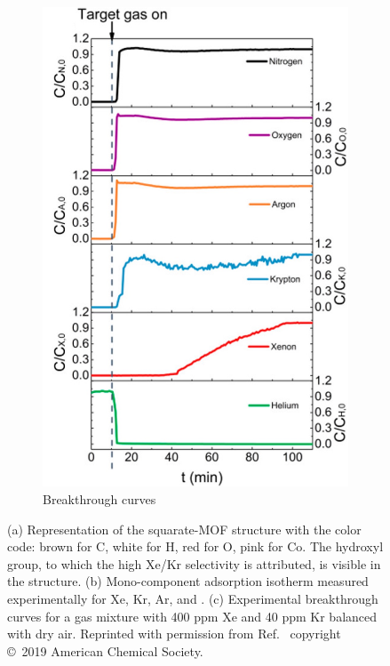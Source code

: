 \documentclass[main]{subfiles}
\begin{document}
\begin{figure}[ht]
\begin{subfigure}[b]{0.25\textwidth}
    \includegraphics[width=\textwidth]{figures/6-perspectives/jacs_li_breakthrough.jpg}
    \caption{Breakthrough curves}\label{fgr:jacs_li_breakthrough}
  \end{subfigure}
  \caption{ (a) Representation of the squarate-MOF  structure with the color code: brown for C, white for H, red for O, pink for Co. The hydroxyl group, to which the high Xe/Kr selectivity is attributed, is visible in the structure. (b) Mono-component adsorption isotherm measured experimentally for Xe, Kr, Ar,  and . (c) Experimental breakthrough curves for a gas mixture with 400 ppm Xe and 40 ppm Kr balanced with dry air. Reprinted with permission from Ref.~\cite{Li_2019} copyright \copyright\ 2019 American Chemical Society. }\label{fgr:jacs_li}
\end{figure}
\end{document}

